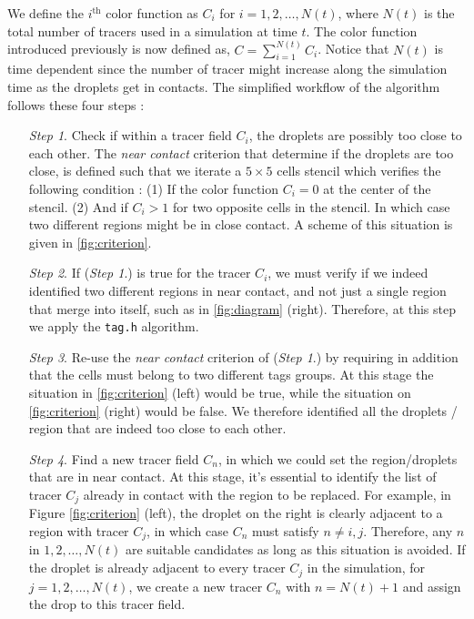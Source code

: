 We define the $i^\text{th}$ color function as $C_i$ for $i =1,2,\ldots,N(t)$, where $N(t)$ is the total number of tracers used in a simulation at time $t$.
The color function introduced previously is now defined as, $C = \sum_{i=1}^{N(t)} C_i$. 
Notice that $N(t)$ is time dependent since the number of tracer might increase along the simulation time as the droplets get in contacts. 
The simplified workflow of the algorithm follows these four steps : 
\begin{enumerate}
    \item[\textit{Step 1}.] Check if within a tracer field $C_i$, the droplets are possibly too close to each other. 
    The \textit{near contact} criterion that determine if the droplets are too close, is defined such that we iterate a $5 \times 5$ cells stencil which verifies the following condition : 
    (1) If the color function $C_i = 0$ at the center of the stencil. 
    (2) And if $C_i > 1$ for two opposite cells in the stencil. 
    In which case two different regions might be in close contact.
    A scheme of this situation is given in \ref{fig:criterion}.  
    \item[\textit{Step 2}.] 
    If (\textit{Step 1}.) is true for the tracer $C_i$, we must verify if we indeed identified two different regions in near contact, and not just a single region that merge into itself, such as in \ref{fig:diagram} (right). 
    Therefore, at this step  we apply the \texttt{tag.h} algorithm.
    \item[\textit{Step 3}.] Re-use the \textit{near contact} criterion of (\textit{Step 1}.) by requiring in addition that the cells must belong to two different tags groups. 
    At this stage the situation in \ref{fig:criterion} (left) would be true, while the situation on \ref{fig:criterion} (right) would be false. 
    We therefore identified all the droplets / region that are indeed too close to each other. 
    \item[\textit{Step 4}.] 
    Find a new tracer field $C_n$, in which we could set the region/droplets that are in near contact. 
    At this stage, it's essential to identify the list of tracer $C_j$ already in contact with the region to be replaced. 
    For example, in Figure \ref{fig:criterion} (left), the droplet on the right is clearly adjacent to a region with tracer $C_j$, in which case $C_n$ must satisfy $n \neq i,j$. 
    Therefore, any $n$ in $1, 2, \ldots, N(t)$ are suitable candidates as long as this situation is avoided. 
    If the droplet is already adjacent to every tracer $C_j$ in the simulation, for $j = 1, 2, \ldots, N(t)$, we create a new tracer $C_n$ with $n = N(t)+1$ and assign the drop to this tracer field.
\end{enumerate}
